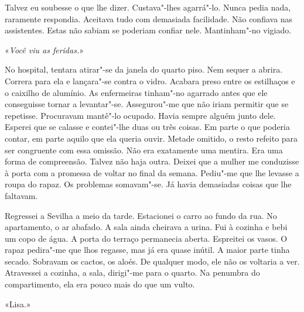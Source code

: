 Talvez eu soubesse o que lhe dizer. Custava"-lhes agarrá"-lo. Nunca
pedia nada, raramente respondia. Aceitava tudo com demasiada facilidade.
Não confiava nas assistentes. Estas não sabiam se poderiam confiar nele.
Mantinham"-no vigiado.

«\emph{Você viu as feridas.}»

No hospital, tentara atirar"-se da janela do quarto piso. Nem sequer a
abrira. Correra para ela e lançara"-se contra o vidro. Acabara preso
entre os estilhaços e o caixilho de alumínio. As enfermeiras tinham"-no
agarrado antes que ele conseguisse tornar a levantar"-se. Assegurou"-me
que não iriam permitir que se repetisse. Procuravam mantê"-lo ocupado.
Havia sempre alguém junto dele. Esperei que se calasse e contei"-lhe
duas ou três coisas. Em parte o que poderia contar, em parte aquilo que
ela queria ouvir. Metade omitido, o resto refeito para ser congruente
com essa omissão. Não era exatamente uma mentira. Era uma forma de
compreensão. Talvez não haja outra. Deixei que a mulher me conduzisse à
porta com a promessa de voltar no final da semana. Pediu"-me que lhe
levasse a roupa do rapaz. Os problemas somavam"-se. Já havia demasiadas
coisas que lhe faltavam.

Regressei a Sevilha a meio da tarde. Estacionei o carro ao fundo da rua.
No apartamento, o ar abafado. A sala ainda cheirava a urina. Fui à
cozinha e bebi um copo de água. A porta do terraço permanecia aberta.
Espreitei os vasos. O rapaz pedira"-me que lhos regasse, mas já era
quase inútil. A maior parte tinha secado. Sobravam os cactos, os aloés.
De qualquer modo, ele não os voltaria a ver. Atravessei a cozinha, a
sala, dirigi"-me para o quarto. Na penumbra do compartimento, ela era
pouco mais do que um vulto.

«Lisa.»

